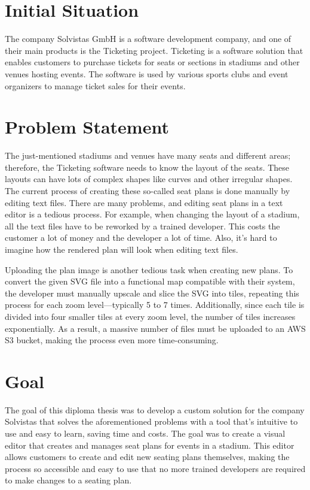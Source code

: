 \section{Initial Situation}
The company Solvistas GmbH is a software development company, and one of their main products is the Ticketing project. Ticketing is a software solution that enables customers to purchase tickets for seats or sections in stadiums and other venues hosting events. The software is used by various sports clubs and event organizers to manage ticket sales for their events.


\section{Problem Statement}
The just-mentioned stadiums and venues have many seats and different areas; therefore, the Ticketing software needs to know the layout of the seats. These layouts can have lots of complex shapes like curves and other irregular shapes. The current process of creating these so-called seat plans is done manually by editing text files. There are many problems, and editing seat plans in a text editor is a tedious process. For example, when changing the layout of a stadium, all the text files have to be reworked by a trained developer. This costs the customer a lot of money and the developer a lot of time. Also, it's hard to imagine how the rendered plan will look when editing text files.

Uploading the plan image is another tedious task when creating new plans. To convert the given SVG file into a functional map compatible with their system, the developer must manually upscale and slice the SVG into tiles, repeating this process for each zoom level—typically 5 to 7 times. Additionally, since each tile is divided into four smaller tiles at every zoom level, the number of tiles increases exponentially. As a result, a massive number of files must be uploaded to an AWS S3 bucket, making the process even more time-consuming.

\section{Goal}
The goal of this diploma thesis was to develop a custom solution for the company Solvistas that solves the aforementioned problems with a tool that's intuitive to use and easy to learn, saving time and costs. The goal was to create a visual editor that creates and manages seat plans for events in a stadium. This editor allows customers to create and edit new seating plans themselves, making the process so accessible and easy to use that no more trained developers are required to make changes to a seating plan.
